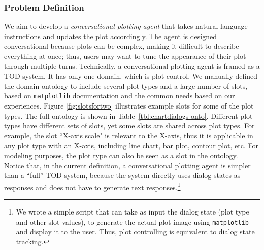 \documentclass[11pt,dvipdfm]{article}
\begin{document}
\subsubsection{Problem Definition}
We aim to develop a \textit{conversational plotting agent} that takes natural language instructions and updates the plot accordingly. The agent is designed conversational because plots can be complex, making it difficult to describe everything at once; thus, users may want to tune the appearance of their plot through multiple turns.
Technically, a conversational plotting agent is framed as a TOD system. It has only one domain, which is plot control. We manually defined the domain ontology to include several plot types and a large number of slots, based on \texttt{matplotlib} documentation and the common needs based on our experiences.
Figure \ref{fig:slotsfortwo} illustrates example slots for some of the plot types. The full ontology is shown in Table~\ref{tbl:chartdialogs-onto}.
Different plot types have different sets of slots, yet some slots are shared across plot types. %
For example, the  slot ``X-axis scale" is relevant to the X-axis, thus it is applicable in any plot type with an X-axis, including line chart, bar plot, contour plot, etc. For modeling purposes, the plot type can also be seen as a slot in the ontology.
Notice that, in the current definition, a conversational plotting agent is simpler than a ``full'' TOD system, because the system directly uses dialog states as responses and does not have to generate text responses.\footnote{We wrote a simple script that can take as input the dialog state (plot type and other slot values), to generate the actual plot image using \texttt{matplotlib} and display it to the user. Thus, plot controlling is equivalent to dialog state tracking.}
\end{document}
